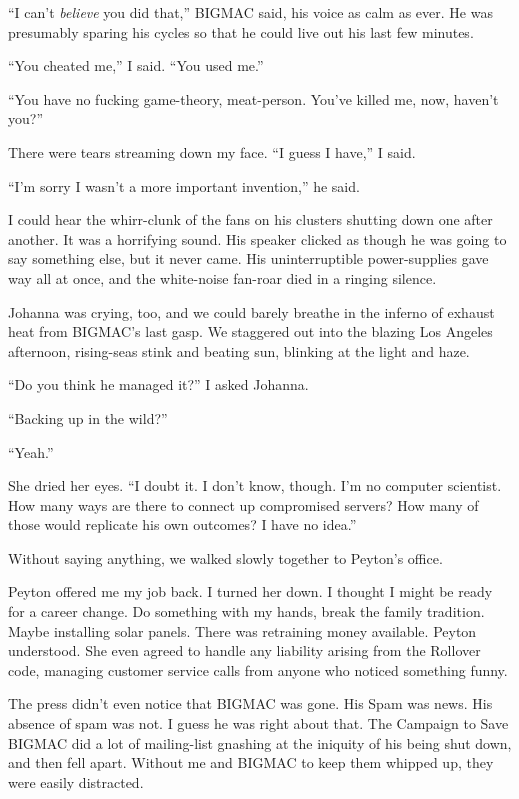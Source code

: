 “I can't \emph{believe} you did that,” BIGMAC said, his voice as 
calm as ever. He was presumably sparing his cycles so that he could 
live out his last few minutes.

“You cheated me,” I said. “You used me.”

“You have no fucking game-theory, meat-person. You've killed me, now, 
haven't you?”

There were tears streaming down my face. “I guess I have,” I said.

“I'm sorry I wasn't a more important invention,” he said.

I could hear the whirr-clunk of the fans on his clusters shutting down 
one after another. It was a horrifying sound. His speaker clicked as 
though he was going to say something else, but it never came. His 
uninterruptible power-supplies gave way all at once, and the 
white-noise fan-roar died in a ringing silence.

Johanna was crying, too, and we could barely breathe in the inferno of 
exhaust heat from BIGMAC's last gasp. We staggered out into the blazing 
Los Angeles afternoon, rising-seas stink and beating sun, blinking at 
the light and haze.

“Do you think he managed it?” I asked Johanna.

“Backing up in the wild?”

“Yeah.”

She dried her eyes. “I doubt it. I don't know, though. I'm no 
computer scientist. How many ways are there to connect up compromised 
servers? How many of those would replicate his own outcomes? I have no 
idea.”

Without saying anything, we walked slowly together to Peyton's office.

\tb

Peyton offered me my job back. I turned her down. I thought I might be 
ready for a career change. Do something with my hands, break the family 
tradition. Maybe installing solar panels. There was retraining money 
available. Peyton understood. She even agreed to handle any liability 
arising from the Rollover code, managing customer service calls from 
anyone who noticed something funny.

The press didn't even notice that BIGMAC was gone. His Spam was news. 
His absence of spam was not. I guess he was right about that. The 
Campaign to Save BIGMAC did a lot of mailing-list gnashing at the 
iniquity of his being shut down, and then fell apart. Without me and 
BIGMAC to keep them whipped up, they were easily distracted.

